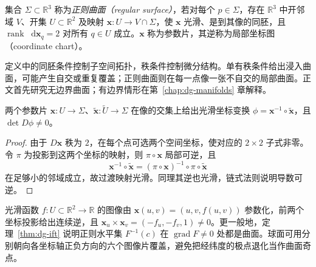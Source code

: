 \documentclass[UTF8,12pt,a4paper,fontset=fandol]{ctexbook}
\newcommand{\R}{\mathbb R}
\newcommand{\dd}{\mathop{}\!\mathrm d}
\DeclareMathOperator{\rank}{rank}
\DeclareMathOperator{\grad}{grad}
\begin{document}
\begin{definition}[正则曲面与参数片]
集合 $\Sigma\subset\R^3$ 称为\emph{正则曲面（regular surface）}，若对每个 $p\in\Sigma$，存在 $\R^3$ 中开邻域 $V$、开集 $U\subset\R^2$ 及映射 $\mathbf x:U\to V\cap\Sigma$，使 $\mathbf x$ 光滑、是到其像的同胚，且 $\rank\dd\mathbf x_q=2$ 对所有 $q\in U$ 成立。$\mathbf x$ 称为参数片，其逆称为局部坐标图（coordinate chart）。
\label{def:dg-surface}
\end{definition}
定义中的同胚条件控制子空间拓扑，秩条件控制微分结构。单有秩条件给出浸入曲面，可能产生自交或重复覆盖；正则曲面则在每一点像一张不自交的局部曲面。正文首先研究无边界曲面；有边界情形在第~\ref{chap:dg-manifolds} 章解释。

\begin{proposition}[坐标过渡的光滑性]
两个参数片 $\mathbf x:U\to\Sigma$、$\widetilde{\mathbf x}:\widetilde U\to\Sigma$ 在像的交集上给出光滑坐标变换 $\phi=\mathbf x^{-1}\circ\widetilde{\mathbf x}$，且 $\det D\phi\ne0$。
\end{proposition}
\begin{proof}
由于 $D\mathbf x$ 秩为 $2$，在每个点可选两个空间坐标，使对应的 $2\times2$ 子式非零。令 $\pi$ 为投影到这两个坐标的映射，则 $\pi\circ\mathbf x$ 局部可逆，且
\[
 \mathbf x^{-1}\circ\widetilde{\mathbf x}
 =(\pi\circ\mathbf x)^{-1}\circ\pi\circ\widetilde{\mathbf x}
\]
在足够小的邻域成立，故过渡映射光滑。同理其逆也光滑，链式法则说明导数可逆。
\end{proof}

\begin{example}[图像、水平集与球面]
光滑函数 $f:U\subset\R^2\to\R$ 的图像由 $\mathbf x(u,v)=(u,v,f(u,v))$ 参数化，前两个坐标投影给出连续逆，且 $\mathbf x_u\times\mathbf x_v=(-f_u,-f_v,1)\ne0$。更一般地，定理~\ref{thm:dg-ift} 说明正则水平集 $F^{-1}(c)$ 在 $\grad F\ne0$ 处都是曲面。球面可用分别朝向各坐标轴正负方向的六个图像片覆盖，避免把经纬度的极点退化当作曲面奇点。
\end{example}
\end{document}
